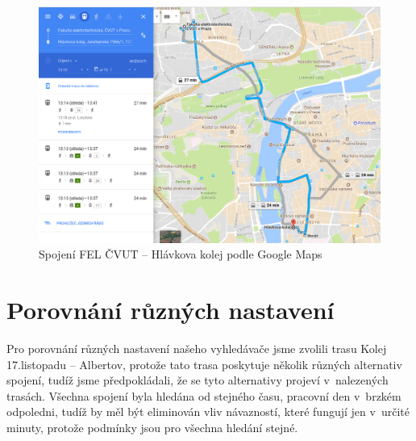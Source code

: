 \begin{figure}[h]
  \centering
    \includegraphics[width=\textwidth]{../img/fel-hlavkova-google.png}
  \caption{Spojení FEL ČVUT -- Hlávkova kolej podle Google Maps}
  \label{fig:fel-hlavkova-google}
\end{figure}

\clearpage
\section{Porovnání různých nastavení}
Pro porovnání různých nastavení našeho vyhledávače jsme zvolili trasu Kolej
17.listopadu -- Albertov, protože tato trasa poskytuje několik různých
alternativ spojení, tudíž jsme předpokládali, že se tyto alternativy projeví
v~nalezených trasách. Všechna spojení byla hledána od stejného času, pracovní den
v~brzkém odpoledni, tudíž by měl být eliminován vliv návazností, které fungují
jen v~určité minuty, protože podmínky jsou pro všechna hledání stejné.

